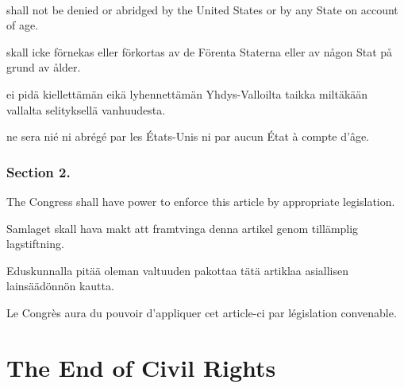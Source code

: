 \documentclass[a4paper,landscape,12pt]{article}
\begin{document}
~

\begin{minipage}[t]{0.22\textwidth}
shall not be denied or abridged by the United States or by any State on account of age.
\end{minipage}\textwidth
\begin{minipage}[t]{0.22\textwidth}
skall icke förnekas eller förkortas av de Förenta Staterna eller av någon Stat på grund av ålder.
\end{minipage}\textwidth
\begin{minipage}[t]{0.22\textwidth}
	 ei pidä kiellettämän eikä lyhennettämän Yhdys-Valloilta taikka miltäkään vallalta selityksellä vanhuudesta.
\end{minipage}\textwidth
\begin{minipage}[t]{0.22\textwidth}
	ne sera nié ni abrégé par les États-Unis ni par aucun État à compte d'âge.
	\end{minipage}

\subsubsection*{Section 2.}
\begin{minipage}[t]{0.22\textwidth}
	The Congress shall have power to enforce this article by appropriate legislation.
\end{minipage}\textwidth
\begin{minipage}[t]{0.22\textwidth}
	Samlaget skall hava makt att framtvinga denna artikel genom tillämplig lagstiftning.
\end{minipage}\textwidth
\begin{minipage}[t]{0.22\textwidth}
	Eduskunnalla pitää oleman valtuuden pakottaa tätä artiklaa asiallisen lainsäädönnön kautta.
\end{minipage}\textwidth
\begin{minipage}[t]{0.22\textwidth}
Le Congrès aura du pouvoir d'appliquer cet article-ci par législation convenable.
\end{minipage}


\section*{The End of Civil Rights}
\end{document}

